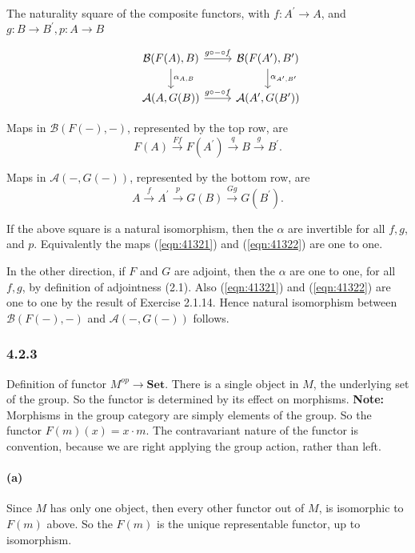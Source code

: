 \documentclass{article}
\begin{document}
The naturality square of the composite functors, with $f: A^\prime \rightarrow A$, and $g: B \rightarrow B^\prime, p\colon A\rightarrow B$

\begin{equation*}
\begin{tikzcd}
  & \mathcal{B}(F(A),B) \arrow[d,"\alpha_{A,B}"] \arrow[r, "g \circ \mathit{-} \circ f"] & \mathcal{B}(F(A^\prime),B^\prime) \arrow[d,"\alpha_{A^\prime,B^\prime}"] \\
  & \mathcal{A}(A,G(B)) \arrow[r,"g \circ \mathit{-} \circ f"] & \mathcal{A}(A^\prime,G(B^\prime))
\end{tikzcd}
\end{equation*}


Maps in $\mathcal{B}(F(\mathit{-}),\mathit{-})$, represented by the top row, are
\begin{equation}
\label{eqn:41321}
F(A) \xrightarrow{Ff} F(A^\prime)\xrightarrow{q} B\xrightarrow{g} B^\prime.
\end{equation}

Maps in $\mathcal{A}(\mathit{-},G(\mathit{-}))$, represented by the bottom row, are
\begin{equation}
\label{eqn:41322}
  A \xrightarrow{f} A^\prime \xrightarrow{p} G(B) \xrightarrow{Gg} G(B^\prime).
\end{equation}

If the above square is a natural isomorphism, then the $\alpha$ are invertible for all $f, g$, and $p$. Equivalently the maps (\ref{eqn:41321}) and (\ref{eqn:41322}) are one to one.

In the other direction, if $F$ and $G$ are adjoint, then the $\alpha$ are one to one, for all $f, g$, by definition of adjointness (2.1). Also (\ref{eqn:41321}) and (\ref{eqn:41322}) are one to one by the result of Exercise 2.1.14. Hence natural isomorphism between $\mathcal{B}(F(\mathit{-}),\mathit{-})$ and $\mathcal{A}(\mathit{-},G(\mathit{-}))$ follows.

\subsubsection*{4.2.3}

Definition of functor $M^{op} \rightarrow \mathbf{Set}$. There is a single object in $M$, the underlying set of the group. So the functor is determined by its effect on morphisms. \textbf{Note: }Morphisms in the group category are simply elements of the group. So the functor $F(m)(x) = x \cdot m$. The contravariant nature of the functor is convention, because we are right applying the group action, rather than left.

\paragraph{(a)} Since $M$ has only one object, then every other functor out of $M$, is isomorphic to $F(m)$ above. So the $F(m)$ is the unique representable functor, up to isomorphism.
\end{document}
